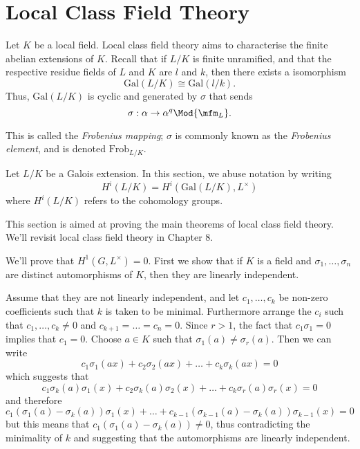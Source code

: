 \documentclass[a4paper, 12pt,oneside,openany]{book}
\begin{document}
\section{Local Class Field Theory}

Let $K$ be a local field. Local class field theory aims to characterise the finite abelian extensions of $K$. Recall that if $L/K$ is finite unramified, and that the respective residue fields of $L$ and $K$ are $l$ and $k$, then there exists a isomorphism $$\text{Gal}(L/K) \cong \text{Gal}(l/k).$$ Thus, $\text{Gal}(L/K)$ is cyclic and generated by $\sigma$ that sends $$\sigma: \alpha \to \alpha^q \Mod{\mfm_L}.$$

This is called the \emph{Frobenius mapping}; $\sigma$ is commonly known as the \emph{Frobenius element}, and is denoted $\text{Frob}_{L/K}$.

Let $L/K$ be a Galois extension. In this section, we abuse notation by writing $$H^i(L/K) = H^i(\text{Gal}(L/K), L^\times)$$ where $H^i(L/K)$ refers to the cohomology groups. 

This section is aimed at proving the main theorems of local class field theory. We'll revisit local class field theory in Chapter 8.


 We'll prove that $H^1(G, L^\times)=0$. First we show that if $K$ is a field and $\sigma_1, \dots, \sigma_n$ are distinct automorphisms of $K$, then they are linearly independent.

Assume that they are not linearly independent, and let $c_1, \dots, c_k$ be non-zero coefficients such that $k$ is taken to be minimal. Furthermore arrange the $c_i$ such that $c_1, \dots, c_k \neq 0$ and $c_{k+1}=\dots = c_n = 0$. Since $r>1$, the fact that $c_1 \sigma_1= 0$ implies that $c_1=0$. Choose $a \in K$ such that $\sigma_1(a) \neq \sigma_r(a).$ Then we can write $$c_1\sigma_1(ax)+c_2\sigma_2(ax)+\dots+c_k\sigma_k(ax)=0$$ which suggests that $$c_1\sigma_k(a)\sigma_1(x) +c_2\sigma_k(a)\sigma_2(x) +\dots+c_k\sigma_r(a)\sigma_r(x)=0$$ and therefore $$c_1(\sigma_1(a)-\sigma_k(a))\sigma_1(x) + \dots + c_{k-1}(\sigma_{k-1}(a)-\sigma_k(a))\sigma_{k-1}(x)=0$$ but this means that $c_1(\sigma_1(a)-\sigma_k(a)) \neq 0$, thus contradicting the minimality of $k$ and suggesting that the automorphisms are linearly independent.
\end{document}
